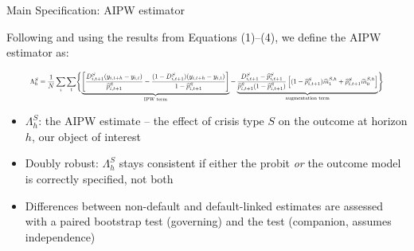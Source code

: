 \documentclass[aspectratio=169]{beamer}
\begin{document}
\begin{frame}{Main Specification: AIPW estimator}
  \footnotesize

Following \citet{jorda2016time} and using the results from Equations (1)--(4),
we define the AIPW estimator as:

  \begin{equation}
  \resizebox{0.92\linewidth}{!}{$\displaystyle
  \Lambda_h^S = \frac{1}{N}\sum_{i}\sum_{t}\Biggl\{
  \underbrace{\left[\frac{D_{i,t+1}^S(y_{i,t+h}-y_{i,t})}{\widehat{p}_{i,t+1}^S}
    - \frac{(1-D_{i,t+1}^S)(y_{i,t+h}-y_{i,t})}{1-\widehat{p}_{i,t+1}^S}\right]}_{\text{IPW term}}
  - \underbrace{\frac{D_{i,t+1}^S - \widehat{p}_{i,t+1}^S}{\widehat{p}_{i,t+1}^S(1-\widehat{p}_{i,t+1}^S)}
    \left[(1-\widehat{p}_{i,t+1}^S)\widehat{m}_1^{S,h} + \widehat{p}_{i,t+1}^S\widehat{m}_0^{S,h}\right]}_{\text{augmentation term}}
  \Biggr\}
  $}
  \end{equation}
  \vspace{-0.2em}
  \begin{itemize}
    \item $\Lambda_h^S$: the AIPW estimate -- the effect of crisis type
    $S$ on the outcome at horizon $h$, our object of interest

    \item Doubly robust: $\Lambda_h^S$ stays consistent if either the
    probit \emph{or} the outcome model is correctly specified, not both


    \item Differences between non-default and default-linked estimates
    are assessed with a paired bootstrap test (governing) and the
    \citet{clogg1995statistical} test (companion, assumes independence)
  \end{itemize}
\end{frame}
\end{document}
